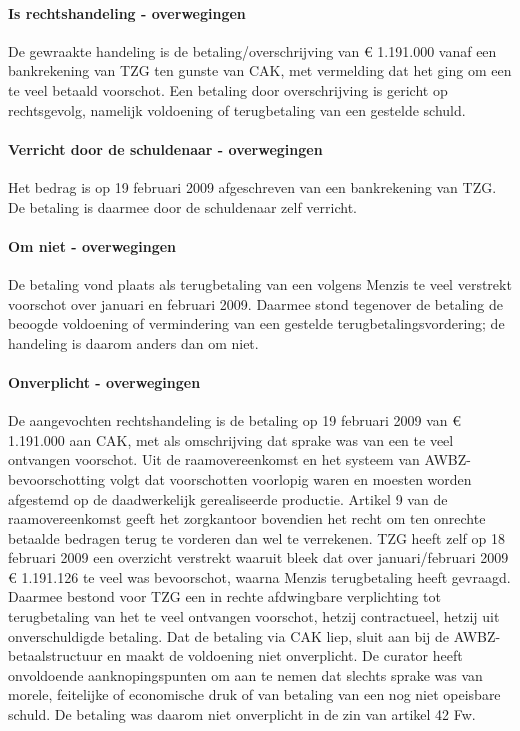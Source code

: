 \documentclass[
  dutch,
  a4paper,
]{article}
\begin{document}
\paragraph{Is rechtshandeling - overwegingen}\label{is-rechtshandeling---overwegingen-88}

De gewraakte handeling is de betaling/overschrijving van € 1.191.000 vanaf een bankrekening van TZG ten gunste van CAK, met vermelding dat het ging om een te veel betaald voorschot. Een betaling door overschrijving is gericht op rechtsgevolg, namelijk voldoening of terugbetaling van een gestelde schuld.

\paragraph{Verricht door de schuldenaar - overwegingen}\label{verricht-door-de-schuldenaar---overwegingen-88}

Het bedrag is op 19 februari 2009 afgeschreven van een bankrekening van TZG. De betaling is daarmee door de schuldenaar zelf verricht.

\paragraph{Om niet - overwegingen}\label{om-niet---overwegingen-88}

De betaling vond plaats als terugbetaling van een volgens Menzis te veel verstrekt voorschot over januari en februari 2009. Daarmee stond tegenover de betaling de beoogde voldoening of vermindering van een gestelde terugbetalingsvordering; de handeling is daarom anders dan om niet.

\paragraph{Onverplicht - overwegingen}\label{onverplicht---overwegingen-88}

De aangevochten rechtshandeling is de betaling op 19 februari 2009 van € 1.191.000 aan CAK, met als omschrijving dat sprake was van een te veel ontvangen voorschot. Uit de raamovereenkomst en het systeem van AWBZ-bevoorschotting volgt dat voorschotten voorlopig waren en moesten worden afgestemd op de daadwerkelijk gerealiseerde productie. Artikel 9 van de raamovereenkomst geeft het zorgkantoor bovendien het recht om ten onrechte betaalde bedragen terug te vorderen dan wel te verrekenen. TZG heeft zelf op 18 februari 2009 een overzicht verstrekt waaruit bleek dat over januari/februari 2009 € 1.191.126 te veel was bevoorschot, waarna Menzis terugbetaling heeft gevraagd. Daarmee bestond voor TZG een in rechte afdwingbare verplichting tot terugbetaling van het te veel ontvangen voorschot, hetzij contractueel, hetzij uit onverschuldigde betaling. Dat de betaling via CAK liep, sluit aan bij de AWBZ-betaalstructuur en maakt de voldoening niet onverplicht. De curator heeft onvoldoende aanknopingspunten om aan te nemen dat slechts sprake was van morele, feitelijke of economische druk of van betaling van een nog niet opeisbare schuld. De betaling was daarom niet onverplicht in de zin van artikel 42 Fw.
\end{document}
